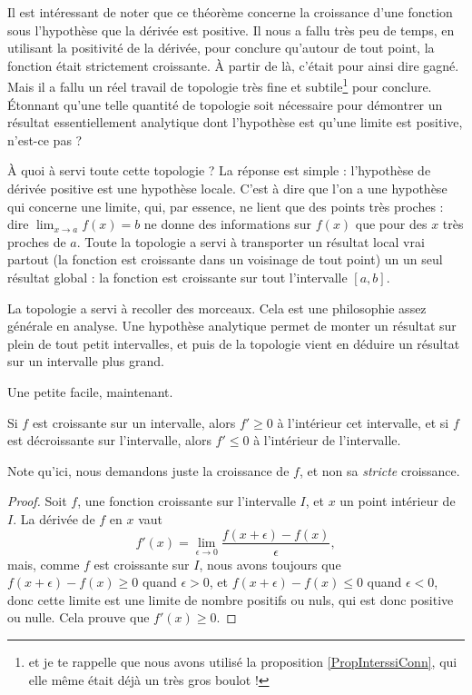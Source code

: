 Il est intéressant de noter que ce théorème concerne la croissance d'une fonction sous l'hypothèse que la dérivée est positive. Il nous a fallu très peu de temps, en utilisant la positivité de la dérivée, pour conclure qu'autour de tout point, la fonction était strictement croissante. À partir de là, c'était pour ainsi dire gagné. Mais il a fallu un réel travail de topologie très fine et subtile\footnote{et je te rappelle que nous avons utilisé la proposition \ref{PropInterssiConn}, qui elle même était déjà un très gros boulot !} pour conclure. Étonnant qu'une telle quantité de topologie soit nécessaire pour démontrer un résultat essentiellement analytique dont l'hypothèse est qu'une limite est positive, n'est-ce pas ? 

À quoi à servi toute cette topologie ? La réponse est simple : l'hypothèse de dérivée positive est une hypothèse locale. C'est à dire que l'on a une hypothèse qui concerne une limite, qui, par essence, ne lient que des points très proches : dire \og $\lim_{x\to a}f(x)=b$\fg{}  ne donne des informations sur $f(x)$ que pour des $x$ très proches de $a$. Toute la topologie a servi à transporter un résultat local vrai partout (la fonction est croissante dans un voisinage de tout point) un un seul résultat global : la fonction est croissante sur tout l'intervalle $[a,b]$.

La topologie a servi à recoller des morceaux. Cela est une philosophie assez générale en analyse. Une hypothèse analytique permet de monter un résultat sur plein de tout petit intervalles, et puis de la topologie vient en déduire un résultat sur un intervalle plus grand.

Une petite facile, maintenant.

\begin{proposition}
	Si $f$ est croissante sur un intervalle, alors $f'\geq 0$ à l'intérieur cet intervalle, et si $f$ est décroissante sur l'intervalle, alors $f'\leq 0$ à l'intérieur de l'intervalle.
\end{proposition}

Note qu'ici, nous demandons juste la croissance de $f$, et non sa \emph{stricte} croissance.

\begin{proof}
	Soit $f$, une fonction croissante sur l'intervalle $I$, et $x$ un point intérieur de $I$. La dérivée de $f$ en $x$ vaut
	\begin{equation}
		f'(x)=\lim_{\epsilon\to 0}\frac{ f(x+\epsilon)-f(x) }{\epsilon},
	\end{equation}
	mais, comme $f$ est croissante sur $I$, nous avons toujours que $f(x+\epsilon)-f(x)\geq0$ quand $\epsilon>0$, et $f(x+\epsilon)-f(x)\leq0$ quand $\epsilon<0$, donc cette limite est une limite de nombre positifs ou nuls, qui est donc positive ou nulle. Cela prouve que $f'(x)\geq 0$.
\end{proof}

